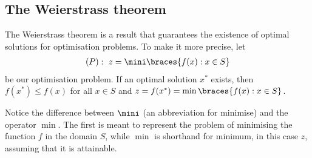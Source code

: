 

\subsection{The Weierstrass theorem}


The Weierstrass theorem is a result that guarantees the existence of optimal solutions for optimisation problems. To make it more precise, let
%
\begin{align*}
	(P) :~ z = \mini\braces{f(x) : x \in S}  
\end{align*}
%
be our optimisation problem. If an optimal solution $x^*$ exists, then $f(x^*) \leq f(x)$ for all $x \in S$ and $z = f(x^*) = \min \braces{f(x) : x \in S}$. 

Notice the difference between $\mini$ (an abbreviation for minimise) and the operator $\min$. The first is meant to represent the problem of minimising the function $f$ in the domain $S$, while $\min$ is shorthand for minimum, in this case $z$, assuming that it is attainable.

